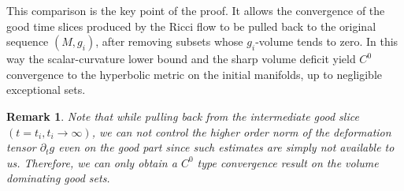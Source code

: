 \documentclass{amsart}
\newtheorem{remark}{Remark}
\begin{document}
\noindent This comparison is the key point of the proof.  It allows the convergence of
the good time slices produced by the Ricci flow to be pulled back to the
original sequence \((M,g_i)\), after removing subsets whose \(g_i\)-volume tends
to zero.  In this way the scalar-curvature lower bound and the sharp volume
deficit yield $C^{0}$ convergence to the hyperbolic metric on the initial manifolds,
up to negligible exceptional sets.
\begin{remark}
Note that while pulling back from the intermediate good slice $(t=t_{i},t_{i}\to\infty)$, we can not control the higher order norm of the deformation tensor $\partial_{t}g$ even on the good part since such estimates are simply not available to us. Therefore, we can only obtain a $C^{0}$ type convergence result on the volume dominating good sets.     
\end{remark}
\end{document}
